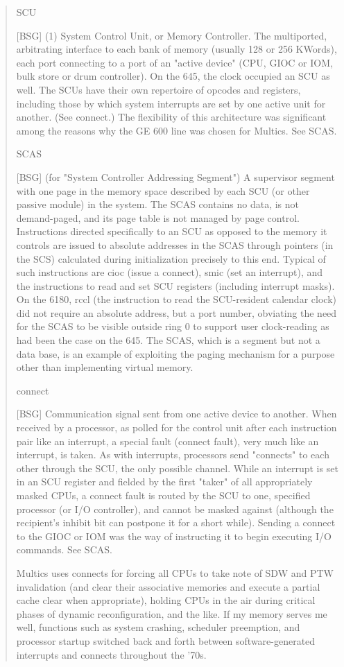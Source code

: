 \documentclass[notitlepage]{report}
\begin{document}
\begin{quote}
SCU

[BSG] (1) System Control Unit, or Memory Controller. The multiported, 
arbitrating interface to each bank of memory (usually 128 or 256 KWords), each
port connecting to a port of an "active device" (CPU, GIOC or IOM, bulk store
or drum controller). On the 645, the clock occupied an SCU as well. The SCUs
have their own repertoire of opcodes and registers, including those by which
system interrupts are set by one active unit for another. (See connect.) The
flexibility of this architecture was significant among the reasons why the GE
600 line was chosen for Multics. See SCAS.

SCAS

[BSG] (for "System Controller Addressing Segment") A supervisor segment with
one page in the memory space described by each SCU (or other passive module) in
the system. The SCAS contains no data, is not demand-paged, and its page table
is not managed by page control. Instructions directed specifically to an SCU as
opposed to the memory it controls are issued to absolute addresses in the SCAS
through pointers (in the SCS) calculated during initialization precisely to
this end. Typical of such instructions are cioc (issue a connect), smic (set an
interrupt), and the instructions to read and set SCU registers (including
interrupt masks). On the 6180, rccl (the instruction to read the SCU-resident
calendar clock) did not require an absolute address, but a port number,
obviating the need for the SCAS to be visible outside ring 0 to support user
clock-reading as had been the case on the 645. The SCAS, which is a segment but
not a data base, is an example of exploiting the paging mechanism for a purpose
other than implementing virtual memory.

connect

[BSG] Communication signal sent from one active device to another. When
received by a processor, as polled for the control unit after each instruction
pair like an interrupt, a special fault (connect fault), very much like an
interrupt, is taken. As with interrupts, processors send "connects" to each
other through the SCU, the only possible channel. While an interrupt is set in
an SCU register and fielded by the first "taker" of all appropriately masked
CPUs, a connect fault is routed by the SCU to one, specified processor (or I/O
controller), and cannot be masked against (although the recipient's inhibit bit
can postpone it for a short while). Sending a connect to the GIOC or IOM was
the way of instructing it to begin executing I/O commands. See SCAS.

Multics uses connects for forcing all CPUs to take note of SDW and PTW
invalidation (and clear their associative memories and execute a partial cache
clear when appropriate), holding CPUs in the air during critical phases of
dynamic reconfiguration, and the like. If my memory serves me well, functions
such as system crashing, scheduler preemption, and processor startup switched
back and forth between software-generated interrupts and connects throughout
the '70s.
\end {quote}
\end{document}
